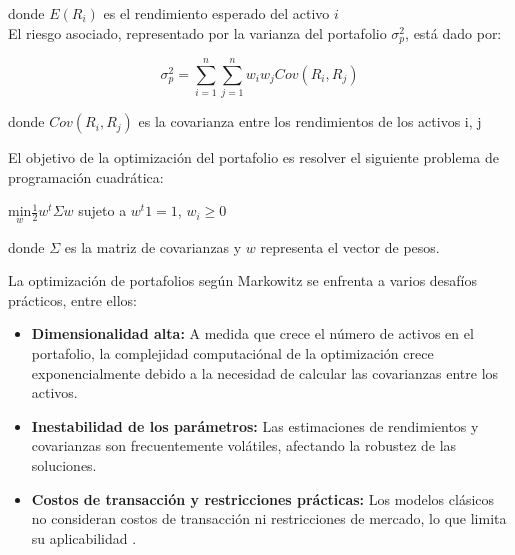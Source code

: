 \documentclass[9pt,a4paper,twoside]{rho-class/rho}
\begin{document}
            donde $E\left({R}_{i}\right)$ es el rendimiento esperado del activo $i$
            \\

            El riesgo asociado, representado por la varianza del portafolio ${\sigma }^{2}_{p}$, está dado por:

            \begin{equation}
            {\sigma }^{2}_{p}=\sum _{i=1}^{n}\sum _{j=1}^{n}{w}_{i}{w}_{j}Cov\left({R}_{i},{R}_{j}\right)
            \end{equation}

            donde $Cov\left({R}_{i},{R}_{j}\right)$ es la covarianza entre los rendimientos de los activos {i}, {j}

            \vspace{2mm}El objetivo de la optimización del portafolio es resolver el siguiente problema de programación cuadrática:

            \begin{center}
                $\underset{w}{\mathrm{min}}\frac{1}{2}{w}^{t}\Sigma w$ sujeto a ${w}^{t}1=1$, ${w}_{i}\ge 0$     
            \end{center}

            \vspace{2mm}donde $\Sigma $ es la matriz de covarianzas y ${w}$ representa el vector de pesos.

            \vspace{2mm}La optimización de portafolios según Markowitz se enfrenta a varios desafíos prácticos, entre ellos:

            \begin{itemize}
                \item \textbf{Dimensionalidad alta:} A medida que crece el número de  activos en el portafolio, la complejidad computaciónal de la optimización crece exponencialmente debido a la necesidad de calcular las covarianzas entre los activos.
                \item \textbf{Inestabilidad de los parámetros:} Las estimaciones de rendimientos y covarianzas son frecuentemente volátiles, afectando la robustez de las soluciones.
                \item \textbf{Costos de transacción y restricciones prácticas:} Los modelos clásicos no consideran costos de transacción ni restricciones de mercado, lo que limita su aplicabilidad \cite{Deb2001}.
            \end{itemize}
\end{document}
